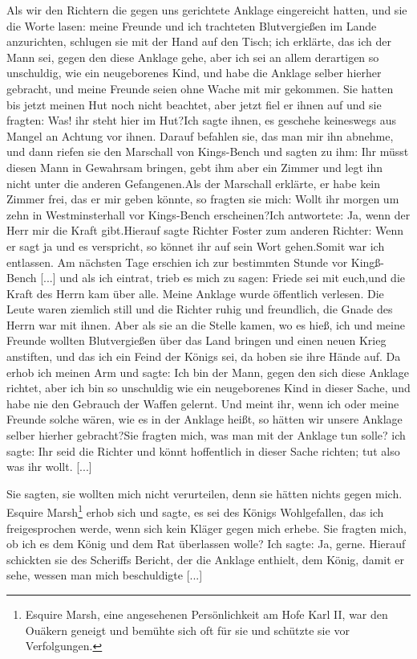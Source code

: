 Als wir den Richtern die gegen uns gerichtete Anklage eingereicht 
hatten, und sie die Worte lasen: meine Freunde und ich
trachteten Blutvergießen im Lande anzurichten, schlugen sie mit
der Hand auf den Tisch; ich erklärte, das ich der Mann sei,
gegen den diese Anklage gehe, aber ich sei an allem derartigen
so unschuldig, wie ein neugeborenes Kind, und habe die Anklage
selber hierher gebracht, und meine Freunde seien ohne Wache mit
mir gekommen. Sie hatten bis jetzt meinen Hut noch nicht
beachtet, aber jetzt fiel er ihnen auf und sie fragten: \glqq Was! ihr
steht hier im Hut?\grqq Ich sagte ihnen, es geschehe keineswegs
aus Mangel an Achtung vor ihnen. Darauf befahlen sie, das
man mir ihn abnehme, und dann riefen sie den Marschall von
Kings-Bench und sagten zu ihm: \glqq Ihr müsst diesen Mann in
Gewahrsam bringen, gebt ihm aber ein Zimmer und legt ihn nicht
unter die anderen Gefangenen.\grqq Als der Marschall erklärte, er
habe kein Zimmer frei, das er mir geben könnte, so fragten sie
mich: \glqq Wollt ihr morgen um zehn in Westminsterhall vor 
Kings-Bench erscheinen?\grqq Ich antwortete: \glqq Ja, wenn der Herr mir die
Kraft gibt.\grqq Hierauf sagte Richter Foster zum anderen Richter:
\glqq Wenn er sagt ja und es verspricht, so könnet ihr auf sein Wort
gehen.\grqq Somit war ich entlassen. Am nächsten Tage erschien
ich zur bestimmten Stunde vor Kingß-Bench [...] und als ich
eintrat, trieb es mich zu sagen: \glqq Friede sei mit euch,\grqq und die
Kraft des Herrn kam über alle. Meine Anklage wurde öffentlich
verlesen. Die Leute waren ziemlich still und die Richter ruhig
und freundlich, die Gnade des Herrn war mit ihnen. Aber als
sie an die Stelle kamen, wo es hieß, ich und meine Freunde
wollten Blutvergießen über das Land bringen und einen neuen
Krieg anstiften, und das ich ein Feind der Königs sei, da hoben
sie ihre Hände auf. Da erhob ich meinen Arm und sagte: \glqq Ich
bin der Mann, gegen den sich diese Anklage richtet, aber ich bin
so unschuldig wie ein neugeborenes Kind in dieser Sache, und
habe nie den Gebrauch der Waffen gelernt. Und meint ihr, wenn
ich oder meine Freunde solche wären, wie es in der Anklage
heißt, so hätten wir unsere Anklage selber hierher gebracht?\grqq [...]
Sie fragten mich, was man mit der Anklage tun solle? ich sagte:
\glqq Ihr seid die Richter und könnt hoffentlich in dieser Sache
richten; tut also was ihr wollt. [...]\grqq

Sie sagten, sie wollten mich nicht verurteilen, denn sie hätten
nichts gegen mich. Esquire Marsh\footnote{Esquire Marsh, eine 
angesehenen Persönlichkeit am Hofe Karl II, war den
Ouäkern geneigt und bemühte sich oft für sie und schützte sie vor 
Verfolgungen.} erhob sich und sagte, es sei
des Königs Wohlgefallen, das ich freigesprochen werde, wenn sich
kein Kläger gegen mich erhebe. Sie fragten mich, ob ich es dem
König und dem Rat überlassen wolle? Ich sagte: \glqq Ja, gerne.\grqq
Hierauf schickten sie des Scheriffs Bericht, der die Anklage enthielt,
dem König, damit er sehe, wessen man mich beschuldigte [...]

